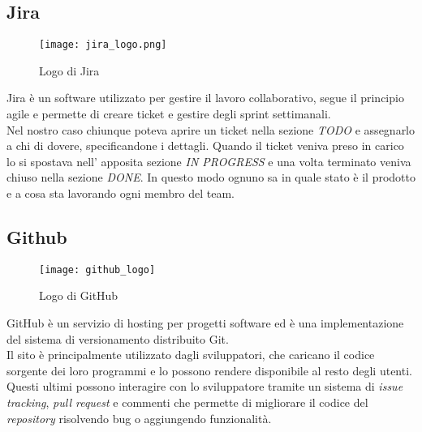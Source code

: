 \subsection{Jira}
\begin{figure}[ht]
    \centering
    \texttt{[image: jira\_logo.png]}
    \caption{Logo di Jira}
\end{figure}

Jira è un software utilizzato per gestire il lavoro collaborativo, segue il principio agile e permette di creare ticket e gestire degli sprint settimanali.\\ Nel nostro caso chiunque poteva aprire un ticket nella sezione \textit{TODO} e assegnarlo a chi di dovere, specificandone i dettagli. Quando il ticket veniva preso in carico lo si spostava nell' apposita sezione \textit{IN PROGRESS} e una volta terminato veniva chiuso nella sezione \textit{DONE}. In questo modo ognuno sa in quale stato è il prodotto e a cosa sta lavorando ogni membro del team.


\subsection{Github}
\begin{figure}[ht]
    \centering
    \texttt{[image: github\_logo]}
    \caption{Logo di GitHub}
\end{figure}

GitHub è un servizio di hosting per progetti software ed è una implementazione del sistema di versionamento distribuito Git.\\ Il sito è principalmente utilizzato dagli sviluppatori, che caricano il codice sorgente dei loro programmi e lo possono rendere disponibile al resto degli utenti. Questi ultimi possono interagire con lo sviluppatore tramite un sistema di \textit{issue tracking}, \textit{pull request} e commenti che permette di migliorare il codice del \textit{repository} risolvendo bug o aggiungendo funzionalità.
